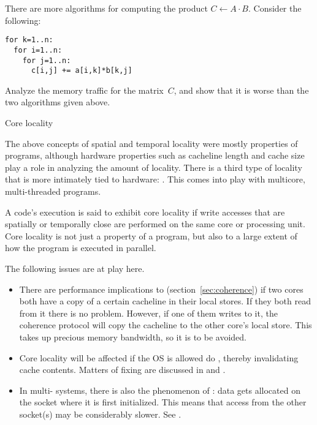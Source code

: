 \begin{exercise}
  There are more algorithms for computing the product $C\leftarrow
  A\cdot B$. Consider the following:
\begin{lstlisting}
for k=1..n:
  for i=1..n:
    for j=1..n:
      c[i,j] += a[i,k]*b[k,j]
\end{lstlisting}
Analyze the memory traffic for the matrix~$C$, and show that it is
worse than the two algorithms given above.
\end{exercise}

\begin{comment}
 The following program is likely inefficient if
\texttt{n} is small and \texttt{N} is large:
\begin{lstlisting}
for (i=0; i<N; i++)
  for (j=0; j<n; j++)
    ... = ... x[j*N+i] ...
\end{lstlisting}
Reversing the loops, when possible, is likely to make the code more
efficient:
\begin{lstlisting}
for (j=0; j<n; j++)
  for (i=0; i<N; i++)
    ... = ... x[j*N+i] ...
\end{lstlisting}
\end{comment}

 {Core locality}

The above concepts of spatial and temporal locality were mostly
properties of programs, although hardware properties such as cacheline
length and cache size play a role in analyzing the amount of
locality. There is a third type of locality that is more intimately
tied to hardware: .
This comes into play with multicore, multi-threaded programs.

A code's execution is said to exhibit core locality if write accesses
that are spatially or temporally close are performed on the same core
or processing unit.
Core locality is not just a property of a program, but also to a large
extent of how the program is executed in parallel.

The following issues are at play here.
\begin{itemize}
\item
  There are performance implications to 
  (section~\ref{sec:coherence})
  if two cores both have a copy of a certain cacheline in their local stores.
  If they both read from it there is no problem. However, if one of them
  writes to it, the coherence protocol will copy the cacheline to the
  other core's local store. This takes up precious memory bandwidth, so
  it is to be avoided.
\item Core locality will be affected if the \ac{OS} is allowed do
  , thereby invalidating cache contents.
  Matters of fixing  are discussed in
   and .
\item In multi- systems, there is also the phenomenon of
  : data gets allocated on the socket where
  it is first initialized.
  This means that access from the other socket(s) may be considerably slower.
  See .
\end{itemize}

